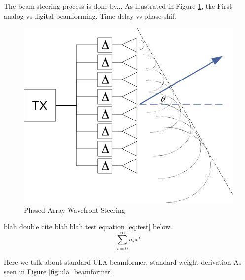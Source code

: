 The beam steering process is done by...
As illustrated in Figure \ref{fig:phased_array}, the
First analog vs digital beamforming. Time delay vs phase shift

\begin{figure}[!htbp]
  \centering
  \includegraphics[]{02_abf_background/phased_array}
  \caption{Phased Array Wavefront Steering}
  \label{fig:phased_array}
\end{figure}

blah double cite \citep{Alexander_and_Ghirnikar,Haykin} blah
blah test equation \ref{eq:test} below.
\begin{equation} \label{eq:test}
  \sum_{i=0}^{\infty} a_i x^i
\end{equation}

Here we talk about standard ULA beamformer, standard weight derivation
As seen in Figure \ref{fig:ula_beamformer}

